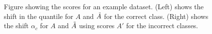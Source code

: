 \begin{figure}
\begin{subfigure}{0.48\linewidth}
    \end{subfigure}
    \caption{Figure showing the scores for an example dataset. (Left) shows the shift in the quantile for $A$ and $\Tilde{A}$ for the correct class. (Right) shows the shift $\alpha_c$ for $A$ and $\Tilde{A}$ using scores $A'$ for the incorrect classes.}
    \label{fig:APS:efficiency}
\end{figure}


